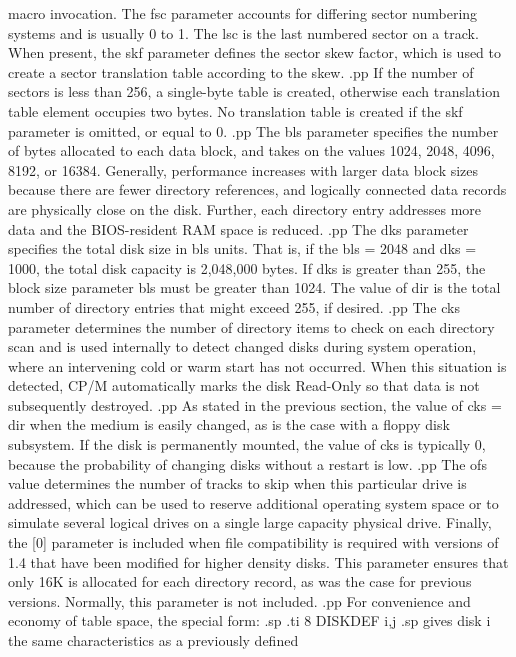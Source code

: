 macro invocation.  The fsc parameter accounts for differing 
sector numbering systems and is usually 0 to 1.  The lsc is the 
last numbered sector on a track.  When present, the skf parameter 
defines the sector skew factor, which is used to create a sector 
translation table according to the skew.
.pp
If the number of sectors is less than 256, a single-byte table is 
created, otherwise each translation table element occupies two 
bytes.  No translation table is created if the skf parameter is 
omitted, or equal to 0.  
.pp
The bls parameter specifies the number of bytes allocated to each 
data block, and takes on the values 1024, 2048, 4096, 8192, or 
16384.  Generally, performance increases with larger data block 
sizes because there are fewer directory references, and logically 
connected data records are physically close on the disk.  
Further, each directory entry addresses more data and the BIOS-resident 
RAM space is reduced.
.pp
The dks parameter specifies the total disk size in bls units.  
That is, if the bls = 2048 and dks = 1000, the total disk 
capacity is 2,048,000 bytes.  If dks is greater than 255, the 
block size parameter bls must be greater than 1024.  The value of 
dir is the total number of directory entries that might exceed 
255, if desired.  
.pp
The cks parameter determines the number of directory items to 
check on each directory scan and is used internally to detect 
changed disks during system operation, where an intervening cold 
or warm start has not occurred.  When this situation is detected, 
CP/M automatically marks the disk Read-Only so that data is not 
subsequently destroyed.
.pp
As stated in the previous section, the value of cks = dir when 
the medium is easily changed, as is the case with a floppy disk 
subsystem.  If the disk is permanently mounted, the value of cks 
is typically 0, because the probability of changing disks without a 
restart is low.  
.pp
The ofs value determines the number of tracks to skip when this 
particular drive is addressed, which can be used to reserve 
additional operating system space or to simulate several logical 
drives on a single large capacity physical drive.  
Finally, the [0] parameter is included when file compatibility is 
required with versions of 1.4 that have been modified for higher 
density disks.  This parameter ensures that only 16K is allocated 
for each directory record, as was the case for previous versions.  
Normally, this parameter is not included.
.pp
For convenience and economy of table space, the special form:
.sp
.ti 8
DISKDEF      i,j
.sp
gives disk i the same characteristics as a previously defined 
